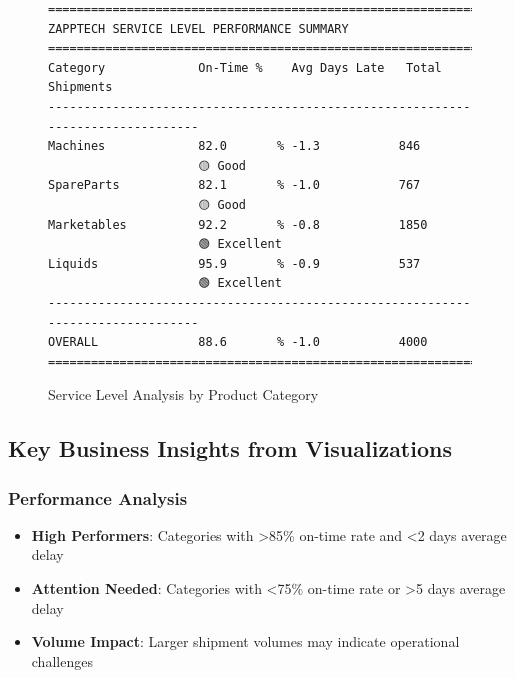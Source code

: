 \documentclass[
  letterpaper,
  DIV=11,
  numbers=noendperiod]{scrartcl}
\providecommand{\tightlist}{%
  \setlength{\itemsep}{0pt}\setlength{\parskip}{0pt}}
\begin{document}
\begin{figure}
\begin{minipage}{0.50\linewidth}
\begin{verbatim}
================================================================================
ZAPPTECH SERVICE LEVEL PERFORMANCE SUMMARY
================================================================================
Category             On-Time %    Avg Days Late   Total Shipments
--------------------------------------------------------------------------------
Machines             82.0       % -1.3           846            
                     🟡 Good                                      
SpareParts           82.1       % -1.0           767            
                     🟡 Good                                      
Marketables          92.2       % -0.8           1850           
                     🟢 Excellent                                 
Liquids              95.9       % -0.9           537            
                     🟢 Excellent                                 
--------------------------------------------------------------------------------
OVERALL              88.6       % -1.0           4000           
================================================================================
\end{verbatim}

\end{minipage}%
%
\begin{minipage}{0.50\linewidth}
Service Level Analysis by Product Category\end{minipage}%

\end{figure}%

\subsection{Key Business Insights from
Visualizations}\label{key-business-insights-from-visualizations}

\subsubsection{Performance Analysis}\label{performance-analysis}

\begin{itemize}
\tightlist
\item
  \textbf{High Performers}: Categories with \textgreater85\% on-time
  rate and \textless2 days average delay
\item
  \textbf{Attention Needed}: Categories with \textless75\% on-time rate
  or \textgreater5 days average delay
\item
  \textbf{Volume Impact}: Larger shipment volumes may indicate
  operational challenges
\end{itemize}
\end{document}
